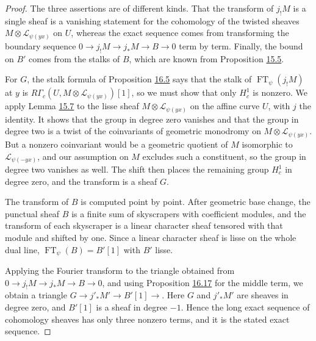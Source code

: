 \documentclass[11pt]{article}
\begin{document}
\begin{proof}[{Proof}]\label{bp228}%
The three assertions are of different kinds. That the transform of \(j_!M\) is a single sheaf is a vanishing statement for the cohomology of the twisted sheaves \(M\otimes\mathcal L_{\psi(yx)}\) on \(U\), whereas the exact sequence comes from transforming the boundary sequence \(0\to j_!M\to j_*M\to B\to0\) term by term. Finally, the bound on \(B'\) comes from the stalks of \(B\), which are known from Proposition \hyperref[bp134]{15.5}.

For \(G\), the stalk formula of Proposition \hyperref[bp183]{16.5} says that the stalk of \(\operatorname{FT}_\psi(j_!M)\) at \(y\) is \(R\Gamma_c(U,M\otimes\mathcal L_{\psi(yx)})[1]\), so we must show that only \(H^1_c\) is nonzero. We apply Lemma \hyperref[bp140]{15.7} to the lisse sheaf \(M\otimes\mathcal L_{\psi(yx)}\) on the affine curve \(U\), with \(j\) the identity. It shows that the group in degree zero vanishes and that the group in degree two is a twist of the coinvariants of geometric monodromy on \(M\otimes\mathcal L_{\psi(yx)}\). But a nonzero coinvariant would be a geometric quotient of \(M\) isomorphic to \(\mathcal L_{\psi(-yx)}\), and our assumption on \(M\) excludes such a constituent, so the group in degree two vanishes as well. The shift then places the remaining group \(H^1_c\) in degree zero, and the transform is a sheaf \(G\).

The transform of \(B\) is computed point by point. After geometric base change, the punctual sheaf \(B\) is a finite sum of skyscrapers with coefficient modules, and the transform of each skyscraper is a linear character sheaf tensored with that module and shifted by one. Since a linear character sheaf is lisse on the whole dual line, \(\operatorname{FT}_\psi(B)=B'[1]\) with \(B'\) lisse.

Applying the Fourier transform to the triangle obtained from \(0\to j_!M\to j_*M\to B\to0\), and using Proposition \hyperref[bp218]{16.17} for the middle term, we obtain a triangle \(G\to j'_*M'\to B'[1]\to\). Here \(G\) and \(j'_*M'\) are sheaves in degree zero, and \(B'[1]\) is a sheaf in degree \(-1\). Hence the long exact sequence of cohomology sheaves has only three nonzero terms, and it is the stated exact sequence.


\end{proof}
\end{document}
